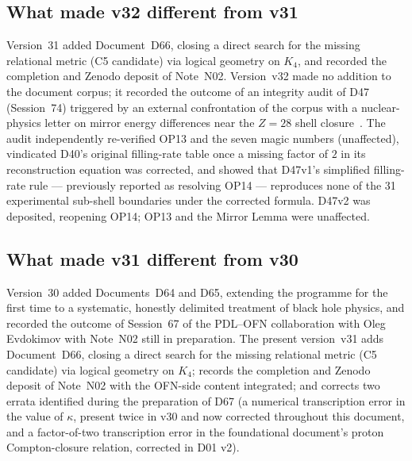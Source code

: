 \documentclass[11pt,a4paper]{article}
\theoremstyle{plain}
\theoremstyle{definition}
\theoremstyle{remark}
\begin{document}
\subsection{What made v32 different from v31}
\label{subsec:diffv31}
Version~31 added Document~D66, closing a direct search for the missing relational metric (C5 candidate) via logical geometry on $K_4$, and recorded the completion and Zenodo deposit of Note~N02. Version~v32 made no addition to the document corpus; it recorded the outcome of an integrity audit of D47 (Session~74) triggered by an external confrontation of the corpus with a nuclear-physics letter on mirror energy differences near the $Z=28$ shell closure~\cite{Pigliapoco2026}. The audit independently re-verified OP13 and the seven magic numbers (unaffected), vindicated D40's original filling-rate table once a missing factor of $2$ in its reconstruction equation was corrected, and showed that D47v1's simplified filling-rate rule --- previously reported as resolving OP14 --- reproduces none of the 31 experimental sub-shell boundaries under the corrected formula. D47v2 was deposited, reopening OP14; OP13 and the Mirror Lemma were unaffected.

\subsection{What made v31 different from v30}
\label{subsec:diffv30}
Version~30 added Documents~D64 and D65, extending the programme for the first time to a systematic, honestly delimited treatment of black hole physics, and recorded the outcome of Session~67 of the PDL--OFN collaboration with Oleg Evdokimov with Note~N02 still in preparation. The present version~v31 adds Document~D66, closing a direct search for the missing relational metric (C5 candidate) via logical geometry on $K_4$; records the completion and Zenodo deposit of Note~N02 with the OFN-side content integrated; and corrects two errata identified during the preparation of D67 (a numerical transcription error in the value of $\kappa$, present twice in v30 and now corrected throughout this document, and a factor-of-two transcription error in the foundational document's proton Compton-closure relation, corrected in D01 v2).
\end{document}
